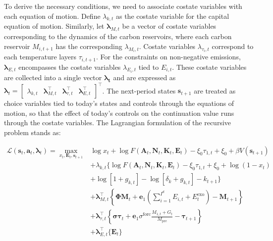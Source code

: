 To derive the necessary conditions, we need to associate costate variables with each equation of motion. Define \(\lambda_{k,t}\) as the costate variable for the capital equation of motion. Similarly, let \(\bm{\lambda}_{M,t}\) be a vector of costate variables corresponding to the dynamics of the carbon reservoirs, where each carbon reservoir \(M_{i,t+1}\) has the corresponding \(\lambda_{M_i, t}\). Costate variables \(\lambda_{\tau_i, t}\) correspond to each temperature layers \(\tau_{i,t+1}\). For the constraints on non-negative emissions, \(\bm{\lambda}_{E,t}\) encompasses the costate variables \(\lambda_{E_i, t}\) tied to \(E_{i,t}\). These costate variables are collected into a single vector \(\bm{\lambda_t}\) and are expressed as \(\bm{\lambda}_t = \begin{bmatrix} \lambda_{k,t} & \bm{\lambda}_{M,t}^\top & \bm{\lambda}_{\tau, t}^\top & \bm{\lambda}_{E,t}^\top \end{bmatrix}^\top\). The next-period states \(\bm{s}_{t+1}\) are treated as choice variables tied to today's states and controls through the equations of motion, so that the effect of today's controls on the continuation value runs through the costate variables. The Lagrangian formulation of the recursive problem stands as:

\begin{equation}
\begin{aligned}
    \mathcal{L}(\bm{s}_t, \bm{a}_t, \bm{\lambda}_t) = \max_{x_t, \bm{E}_t, \bm{s}_{t+1}}
    & \log x_t + \log F(\bm{A}_t,\bm{N}_t,\bm{K}_t,\bm{E}_t) - \xi_0\tau_{1,t} + \xi_0
    + \beta V(\bm{s}_{t+1}) \\
        &+ \lambda_{k,t} \bigg\{\log F(\bm{A}_t,\bm{N}_t,\bm{K}_t,\bm{E}_t) - \xi_0\tau_{1,t} + \xi_0 + \log(1-x_t) \\
            &+ \log[1+g_{k,t}] - \log[\delta_k + g_{k,t}] - k_{t+1}
            \bigg\} \\
        &+ \bm{\lambda}_{M,t}^\top \left\{ \bm{\Phi}\bm{M}_t + \bm{e}_1\left (\sum_{i=1}^{I^d}E_{i,t} + E_t^{\text{exo}} \right) - \bm{M}_{t+1}
            \right\} \\
        &+ \bm{\lambda}_{\tau,t}^\top \left\{ \bm{\sigma} \bm{\tau}_t + \bm{e}_1\sigma^{\text{forc}}\frac{M_{1,t}+G_t} {M_{\text{pre}}} - \bm{\tau}_{t+1} \right \} \\
        &+ \bm{\lambda}_{E,t}^\top\{\bm{E}_t\}
\end{aligned}
\label{eq:lagrangian_recursive_problem}
\end{equation}

